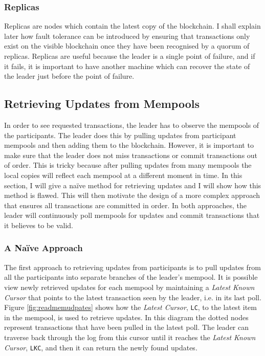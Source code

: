 \documentclass[12pt,a4paper,twoside,openright]{report}
\begin{document}
	\subsubsection*{Replicas}
	Replicas are nodes which contain the latest copy of the blockchain. 
	I shall explain later how fault tolerance can be introduced by ensuring that transactions only exist on the visible blockchain once they have been recognised by a quorum of replicas.
	Replicas are useful because the leader is a single point of failure, and if it fails, it is important to have another machine which can recover the state of the leader just before the point of failure.
	
	\subsection{Retrieving Updates from Mempools}
	In order to see requested transactions, the leader has to observe the mempools of the participants. 
	The leader does this by pulling updates from participant mempools and then adding them to the blockchain.
	However, it is important to make sure that the leader does not miss transactions or commit transactions out of order.
	This is tricky because after pulling updates from many mempools the local copies will reflect each mempool at a different moment in time.
	In this section, I will give a na\"{i}ve method for retrieving updates and I will show how this method is flawed. 
	This will then motivate the design of a more complex approach that ensures all transactions are committed in order.
	In both approaches, the leader will continuously poll mempools for updates and commit transactions that it believes to be valid. \\
	
	\subsubsection*{A Na\"{i}ve Approach}
	The first approach to retrieving updates from participants is to pull updates from all the participants into separate branches of the leader's mempool.
	It is possible view newly retrieved updates for each mempool by maintaining a \textit{Latest Known Cursor} that points to the latest transaction seen by the leader, i.e. in its last poll.
	Figure \ref{fig:readmemudpates} shows how the \textit{Latest Cursor}, \texttt{LC}, to the latest item in the mempool, is used to retrieve updates.
	In this diagram the dotted nodes represent transactions that have been pulled in the latest poll.
	The leader can traverse back through the log from this cursor until it reaches the \textit{Latest Known Cursor}, \texttt{LKC}, and then it can return the newly found updates.\\
\end{document}

